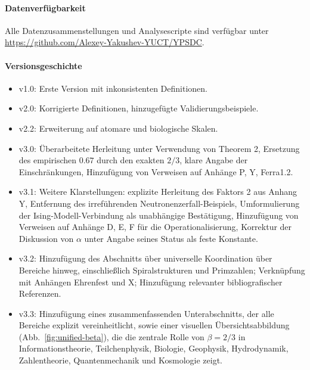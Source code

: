 \documentclass[12pt]{article}
\begin{document}
	\paragraph*{Datenverfügbarkeit}
	Alle Datenzusammenstellungen und Analysescripte sind verfügbar unter \url{https://github.com/Alexey-Yakushev-YUCT/YPSDC}.
	
	\paragraph*{Versionsgeschichte}
	\begin{itemize}
		\item v1.0: Erste Version mit inkonsistenten Definitionen.
		\item v2.0: Korrigierte Definitionen, hinzugefügte Validierungsbeispiele.
		\item v2.2: Erweiterung auf atomare und biologische Skalen.
		\item v3.0: Überarbeitete Herleitung unter Verwendung von Theorem 2, Ersetzung des empirischen \(0.67\) durch den exakten \(2/3\), klare Angabe der Einschränkungen, Hinzufügung von Verweisen auf Anhänge P, Y, Ferra1.2.
		\item v3.1: Weitere Klarstellungen: explizite Herleitung des Faktors 2 aus Anhang Y, Entfernung des irreführenden Neutronenzerfall-Beispiels, Umformulierung der Ising-Modell-Verbindung als unabhängige Bestätigung, Hinzufügung von Verweisen auf Anhänge D, E, F für die Operationalisierung, Korrektur der Diskussion von \(\alpha\) unter Angabe seines Status als feste Konstante.
		\item v3.2: Hinzufügung des Abschnitts über universelle Koordination über Bereiche hinweg, einschließlich Spiralstrukturen und Primzahlen; Verknüpfung mit Anhängen Ehrenfest und X; Hinzufügung relevanter bibliografischer Referenzen.
		\item v3.3: Hinzufügung eines zusammenfassenden Unterabschnitts, der alle Bereiche explizit vereinheitlicht, sowie einer visuellen Übersichtsabbildung (Abb.~\ref{fig:unified-beta}), die die zentrale Rolle von \(\beta = 2/3\) in Informationstheorie, Teilchenphysik, Biologie, Geophysik, Hydrodynamik, Zahlentheorie, Quantenmechanik und Kosmologie zeigt.
	\end{itemize}
	
\end{document}
